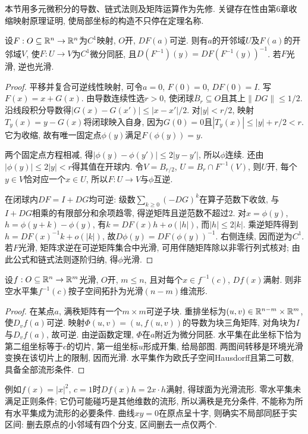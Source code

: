 本节用多元微积分的导数、链式法则及矩阵运算作为先修. 关键存在性由第6章收缩映射原理证明, 使局部坐标的构造不只停在定理名称.
\begin{theorem}[有限维逆函数定理]\label{thm:inverse-function}
设$F:O\subseteq\mathbb R^n\to\mathbb R^n$为$C^1$映射, $O$开, $DF(a)$可逆. 则有$a$的开邻域$U$及$F(a)$的开邻域$V$, 使$F:U\to V$为$C^1$微分同胚, 且$D(F^{-1})(y)=DF(F^{-1}(y))^{-1}$. 若$F$光滑, 逆也光滑.
\end{theorem}
\begin{proof}
平移并复合可逆线性映射, 可令$a=0$, $F(0)=0$, $DF(0)=I$. 写$F(x)=x+G(x)$. 由导数连续性选$r>0$, 使闭球$\overline B_r\subseteq O$且其上$\lVert DG\rVert\le1/2$. 沿线段积分导数得$|G(x)-G(x')|\le|x-x'|/2$. 对$|y|<r/2$, 映射$T_y(x)=y-G(x)$将闭球映入自身, 因为$G(0)=0$且$|T_y(x)|\le|y|+r/2<r$. 它为收缩, 故有唯一固定点$\phi(y)$满足$F(\phi(y))=y$.

两个固定点方程相减, 得$|\phi(y)-\phi(y')|\le2|y-y'|$, 所以$\phi$连续. 还由$|\phi(y)|\le2|y|<r$得其值在开球内. 令$V=B_{r/2}$, $U=B_r\cap F^{-1}(V)$, 则$U$开, 每个$y\in V$恰对应一个$x\in U$, 所以$F:U\to V$与$\phi$互逆.

在闭球内$DF=I+DG$均可逆: 级数$\sum_{k\ge0}(-DG)^k$在算子范数下收敛, 与$I+DG$相乘的有限部分和余项趋零, 得逆矩阵且逆范数不超过$2$. 对$x=\phi(y)$, $h=\phi(y+k)-\phi(y)$, 有$k=DF(x)h+o(|h|)$, 而$|h|\le2|k|$. 乘逆矩阵得到$h=DF(x)^{-1}k+o(|k|)$, 故$D\phi(y)=DF(\phi(y))^{-1}$. 右侧连续, 因而逆为$C^1$. 若$F$光滑, 矩阵求逆在可逆矩阵集合中光滑, 可用伴随矩阵除以非零行列式核对; 由此公式和链式法则逐阶归纳, 得$\phi$光滑.
\end{proof}

\begin{theorem}[正则水平集]\label{thm:regular-level}
设$f:O\subseteq\mathbb R^n\to\mathbb R^m$光滑, $O$开, $m\le n$, 且对每个$x\in f^{-1}(c)$, $Df(x)$满射. 则非空水平集$f^{-1}(c)$按子空间拓扑为光滑$(n-m)$维流形.
\end{theorem}
\begin{proof}
在某点$a$, 满秩矩阵有一个$m\times m$可逆子块. 重排坐标为$(u,v)\in\mathbb R^{n-m}\times\mathbb R^m$, 使$D_vf(a)$可逆. 映射$\Phi(u,v)=(u,f(u,v))$的导数为块三角矩阵, 对角块为$I$与$D_vf(a)$, 故可逆. 由逆函数定理, $\Phi$在$a$附近为微分同胚. 水平集在此坐标下恰为第二组坐标等于$c$的切片, 第一组坐标$u$形成开集, 给局部图. 两图间转移是环境光滑变换在该切片上的限制, 因而光滑. 水平集作为欧氏子空间Hausdorff且第二可数, 具备全部流形条件.
\end{proof}
例如$f(x)=|x|^2$, $c=1$时$Df(x)h=2x\cdot h$满射, 得球面为光滑流形. 零水平集未满足正则条件; 它仍可能碰巧是其他维数的流形, 所以满秩是充分条件, 不能称为所有水平集成为流形的必要条件. 曲线$xy=0$在原点呈十字, 则确实不局部同胚于实区间: 删去原点的小邻域有四个分支, 区间删去一点仅两个.

